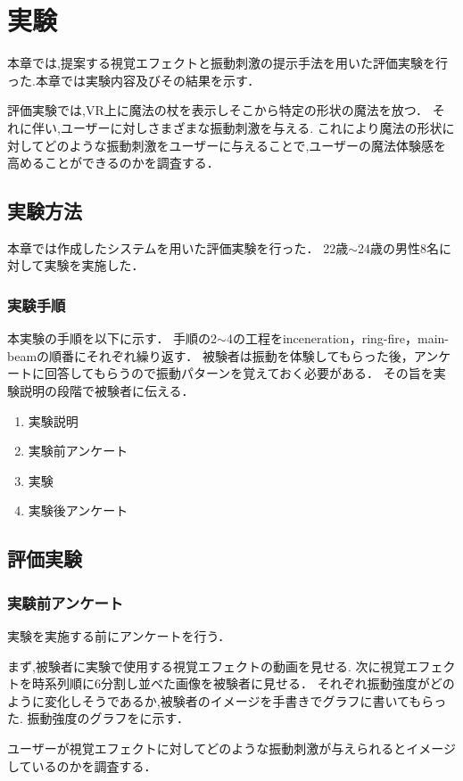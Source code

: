 \chapter{実験}
本章では,提案する視覚エフェクトと振動刺激の提示手法を用いた評価実験を行った.本章では実験内容及びその結果を示す．

評価実験では,VR上に魔法の杖を表示しそこから特定の形状の魔法を放つ．
それに伴い,ユーザーに対しさまざまな振動刺激を与える.
これにより魔法の形状に対してどのような振動刺激をユーザーに与えることで,ユーザーの魔法体験感を高めることができるのかを調査する．

\section{実験方法}
本章では作成したシステムを用いた評価実験を行った．
22歳$\sim$24歳の男性8名に対して実験を実施した．

\subsection{実験手順}
本実験の手順を以下に示す．
手順の2$\sim$4の工程をinceneration，ring-fire，main-beamの順番にそれぞれ繰り返す．
被験者は振動を体験してもらった後，アンケートに回答してもらうので振動パターンを覚えておく必要がある．
その旨を実験説明の段階で被験者に伝える．

\begin{enumerate}
    \item 実験説明
    \item 実験前アンケート
    \item 実験
    \item 実験後アンケート
\end{enumerate}

\newpage
\section{評価実験}
\subsection{実験前アンケート}
実験を実施する前にアンケートを行う．

まず,被験者に実験で使用する視覚エフェクトの動画を見せる.
次に視覚エフェクトを時系列順に6分割し並べた画像を被験者に見せる．
それぞれ振動強度がどのように変化しそうであるか,被験者のイメージを手書きでグラフに書いてもらった.
振動強度のグラフをに示す．

ユーザーが視覚エフェクトに対してどのような振動刺激が与えられるとイメージしているのかを調査する．

